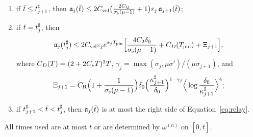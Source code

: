 \begin{proposition}
\begin{enumerate}[label=\textup{(\roman*)}]
  \begin{equation}
  \label{eq:relay-before-activation}
  \maj^{\mathrm{in}}_j(t)\le \Cvel \Big(\frac{2C_Q}{\sigb(\mu-1)}+1\Big)\varepsilon_j\,\maj_{j+1}(t);
  \end{equation}
\item if $\bar t\le t^\sharp_{j+1}$, then
  $\mathfrak{a}_j(\bar t)\le2C_{\mathrm{vel}} \big(\frac{2C_Q}{\sigma_\flat(\mu-1)}+1\big)\varepsilon_j\,\mathfrak{a}_{j+1}(\bar t)$;
\item if $\bar t=t^\sharp_j$, then
  \begin{equation}
  \label{eq:relay}
  \mathfrak{a}_j(t^\sharp_j)\le2C_{\mathrm{vel}} \varepsilon_je^{x_jT_{\mathrm{pin}}}\Big[\frac{4C_2\delta_0}{\sigma_\flat(\mu-1)}+C_D(T_{\mathrm{pin}})+\Xi_{j+1}\Big],
  \end{equation}
  where $C_D(T)=(2+2C_{*} T)^3T$,
  $\gamma_j=\max(\sigma_j,\mu\sigma')/(\mu\sigma_{j+1})$, and
  \begin{equation}
  \label{eq:relay-remainder}
  \Xi_{j+1}=C_{\mathrm R}\Big(1+\frac1{\sigma_\flat(\mu-1)}\Big)\delta_0\Big(\frac{\kappa^\sharp_{j+1}}{\delta_0}\Big)^{1-\gamma_j}\Big\langle\log\frac{\delta_0}{\kappa^\sharp_{j+1}}\Big\rangle^4;
  \end{equation}
\item if $t^\sharp_{j+1}<\bar t<t^\sharp_j$, then $\mathfrak{a}_j(\bar t)$ is at most the right side
  of Equation~\eqref{eq:relay}.
\end{enumerate}
All times used are at most $\bar t$ or are determined by $\omega^{(n)}$ on
$[0,\bar t]$.
\end{proposition}

